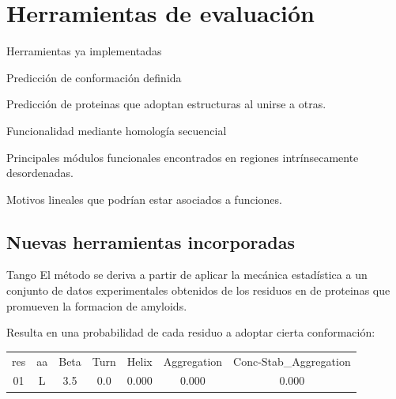 \documentclass{beamer}
\begin{document}
\section{Herramientas de evaluación}

\begin{frame}{Herramientas ya implementadas}
\begin{description}[]
   \item[IUPred:] Predicción de conformación definida 
   \item[ANCHOR:] Predicción de proteinas que adoptan estructuras al unirse a otras. 
   \item[BLAST:] Funcionalidad mediante homología secuencial  
   \item[ELM:] Principales módulos funcionales encontrados en regiones intrínsecamente desordenadas.
   \item[Prosite:] Motivos lineales que podrían estar asociados a funciones.
\end{description}

\end{frame}


\subsection{Nuevas herramientas incorporadas}

\begin{frame}{Tango}
El método se deriva a partir de aplicar la mecánica estadística a un conjunto de datos 
experimentales obtenidos de los residuos en de proteinas que promueven la formacion de amyloids. 

Resulta en una probabilidad de cada residuo a adoptar cierta conformación:
\\[2ex]
\begin{tabular}[h]{c| c| c| c| c| c| c}
res & aa & Beta &Turn &	Helix	& Aggregation &	Conc-Stab\_Aggregation \\
01 &	L	&3.5&	 0.0&	0.000&	0.000 &	0.000\\ 

\end{tabular}
\end{frame}
\end{document}
